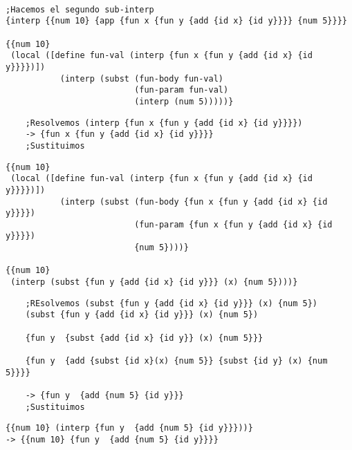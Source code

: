 \documentclass[a4paper]{article}
\begin{document}
\color{blue}
\begin{verbatim}

;Hacemos el segundo sub-interp
{interp {{num 10} {app {fun x {fun y {add {id x} {id y}}}} {num 5}}}}

{{num 10}
 (local ([define fun-val (interp {fun x {fun y {add {id x} {id y}}}})])
           (interp (subst (fun-body fun-val)
                          (fun-param fun-val)
                          (interp (num 5)))))}                  
 \end{verbatim}
\color{clargreen}
\begin{verbatim}
    ;Resolvemos (interp {fun x {fun y {add {id x} {id y}}}})
    -> {fun x {fun y {add {id x} {id y}}}}
    ;Sustituimos
\end{verbatim}
\color{blue}
\begin{verbatim}
{{num 10}
 (local ([define fun-val (interp {fun x {fun y {add {id x} {id y}}}})])
           (interp (subst (fun-body {fun x {fun y {add {id x} {id y}}}})
                          (fun-param {fun x {fun y {add {id x} {id y}}}})
                          {num 5})))}
                          
{{num 10}
 (interp (subst {fun y {add {id x} {id y}}} (x) {num 5})))}
\end{verbatim}
\color{clargreen}
\begin{verbatim}
    ;REsolvemos (subst {fun y {add {id x} {id y}}} (x) {num 5})
    (subst {fun y {add {id x} {id y}}} (x) {num 5})
    
    {fun y  {subst {add {id x} {id y}} (x) {num 5}}}
    
    {fun y  {add {subst {id x}(x) {num 5}} {subst {id y} (x) {num 5}}}}
    
    -> {fun y  {add {num 5} {id y}}}
    ;Sustituimos
\end{verbatim}
\color{blue}
\begin{verbatim}
{{num 10} (interp {fun y  {add {num 5} {id y}}}))}
-> {{num 10} {fun y  {add {num 5} {id y}}}}
\end{verbatim}
\color{applegreen}
\end{document}
